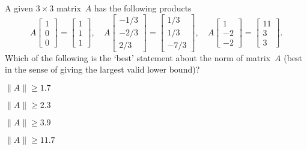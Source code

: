 \begin{activity}
A given \(3\times3\) matrix~\(A\) has the following products
\begin{equation*}
A\begin{bmatrix} 1\\0\\0 \end{bmatrix}
=\begin{bmatrix} 1\\1\\1 \end{bmatrix},\quad
A\begin{bmatrix} -1/3\\-2/3\\2/3 \end{bmatrix}
=\begin{bmatrix} 1/3\\1/3\\-7/3 \end{bmatrix},\quad
A\begin{bmatrix} 1\\-2\\-2 \end{bmatrix}
=\begin{bmatrix} 11\\3\\3 \end{bmatrix}.
\end{equation*}
Which of the following is the `best' statement about the norm of matrix~\(A\) (best in the sense of giving the largest valid lower bound)?
\begin{parts}
\item \(\|A\|\geq 1.7\)
\item \(\|A\|\geq 2.3\)
\item \(\|A\|\geq 3.9\)
\item \(\|A\|\geq 11.7\)
\end{parts}
\end{activity}




